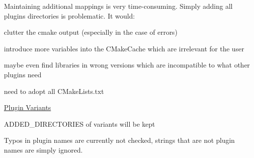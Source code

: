 Maintaining additional mappings is very time-\/consuming. Simply adding all plugins directories is problematic. It would\+:


\begin{DoxyItemize}
\item clutter the cmake output (especially in the case of errors)
\item introduce more variables into the C\+Make\+Cache which are irrelevant for the user
\item maybe even find libraries in wrong versions which are incompatible to what other plugins need
\end{DoxyItemize}


\begin{DoxyItemize}
\item need to adopt all C\+Make\+Lists.\+txt
\end{DoxyItemize}


\begin{DoxyItemize}
\item \hyperlink{doc_decisions_plugin_variants_md}{Plugin Variants}
\end{DoxyItemize}


\begin{DoxyItemize}
\item {\ttfamily A\+D\+D\+E\+D\+\_\+\+D\+I\+R\+E\+C\+T\+O\+R\+I\+ES} of variants will be kept
\item Typos in plugin names are currently not checked, strings that are not plugin names are simply ignored. 
\end{DoxyItemize}